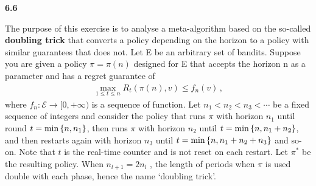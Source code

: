 \textbf{\noindent\textbf{6.6}}

The purpose of this exercise is to analyse a meta-algorithm based on the so-called \textbf{doubling trick} that converts a policy depending on the horizon to a policy with similar
guarantees that does not. Let E be an arbitrary set of bandits. Suppose you are given a policy $\pi=\pi(n)$
designed for E that accepts the horizon n as a parameter and has a regret guarantee of
\begin{align*}
    \max_{1\leq t\leq n} R_t(\pi(n),v)\leq f_n(v) \, ,
\end{align*}
where $f_n:\mathcal{E}\rightarrow [0,+\infty)$ is a sequence of function. Let $n_1 < n_2 < n_3 < \cdots$ be a fixed sequence of integers and consider the policy that runs $\pi$ with horizon $n_1$ until round $t =\min\left\{ n, n_1 \right\}$, then runs $\pi$ with horizon $n_2$ until $t = \min\left\{ n, n_1 + n_2 \right\}$, and then restarts again with horizon $n_3$ until $t = \min\left\{ n, n_1 + n_2 + n_3 \right\}$ and so-on. Note that $t$ is the real-time counter and is not reset on each restart. Let $\pi^*$ be the resulting policy. When $n_{l+1} = 2n_l$ , the length of periods when $\pi$ is used double with each phase, hence the name ‘doubling trick’.

